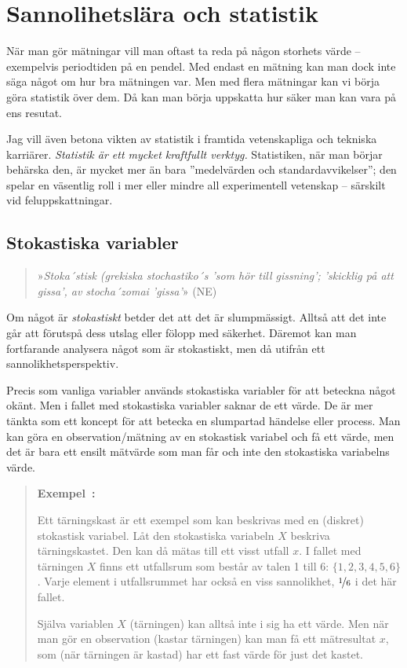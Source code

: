 \documentclass[11pt,a4paper, swedish
]{article}
\newcounter{exempel_counter}%
\newenvironment{exempel}
{
  \refstepcounter{exempel_counter}
  \begin{quote}
  \noindent\textbf{Exempel~\arabic{exempel_counter}:}
}{
  \end{quote}
}
\begin{document}
\section{Sannolihetslära och statistik}\label{sec:statistik}
När man gör mätningar vill man oftast ta reda på någon storhets värde
-- exempelvis periodtiden på en pendel. Med endast en mätning kan man
dock inte säga något om hur bra mätningen var. Men med flera mätningar
kan vi börja göra statistik över dem. Då kan man börja uppskatta hur
säker man kan vara på ens resutat.

Jag vill även betona vikten av statistik i framtida vetenskapliga och
tekniska karriärer. \emph{Statistik är ett mycket kraftfullt verktyg.}
Statistiken, när man börjar behärska den, är mycket mer än bara
''medelvärden och standardavvikelser''; den spelar en väsentlig roll i
mer eller mindre all experimentell vetenskap -- särskilt vid
feluppskattningar. 

\subsection{Stokastiska variabler}
\begin{quote}
»{\it Stoka\!´stisk (grekiska stochastiko\!´s 'som hör till gissning';
  'skicklig på att gissa', av stocha\!´zomai 'gissa'}» (NE)
\end{quote}
Om något är \emph{stokastiskt} betder det att det är
slumpmässigt. Alltså att det inte går att förutspå dess utslag eller
fölopp med säkerhet. Däremot kan man fortfarande analysera något som
är stokastiskt, men då utifrån ett sannolikhetsperspektiv. 

Precis som vanliga variabler används stokastiska variabler för att
beteckna något okänt. Men i fallet med stokastiska variabler saknar de
ett värde. De är mer tänkta som ett koncept för att betecka en
slumpartad händelse eller process. Man kan göra en observation/mätning
av en stokastisk variabel och få ett värde, men det är bara ett ensilt 
mätvärde som man får och inte den stokastiska variabelns värde. 

\begin{exempel}
Ett tärningskast är ett exempel som kan beskrivas med en (diskret)
stokastisk variabel. Låt den stokastiska variabeln $X$ beskriva
tärningskastet. Den kan då mätas till ett visst utfall 
$x$. I fallet med tärningen $X$ finns ett utfallsrum som består av
talen 1 till 6: $\{1, 2, 3, 4, 5, 6\}$. Varje element i utfallsrummet
har också en viss sannolikhet, $\nicefrac{1}{6}$ i det här fallet.
 
Själva variablen $X$ (tärningen) kan alltså inte i sig ha ett värde.
Men när man gör en observation (kastar tärningen) kan man få ett
mätresultat $x$, som (när tärningen är kastad) har ett fast värde för
just det kastet. 
\end{exempel}
\end{document}
